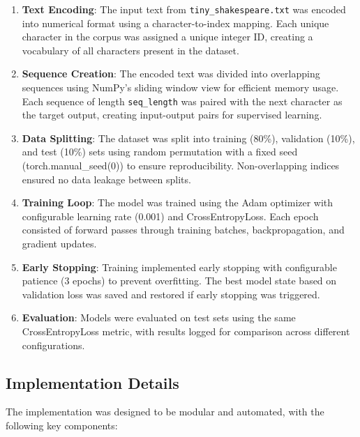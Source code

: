 \documentclass[12pt]{article}
\begin{document}
\begin{enumerate}
    \item \textbf{Text Encoding}: The input text from \texttt{tiny\_shakespeare.txt} was encoded into numerical format using a character-to-index mapping. Each unique character in the corpus was assigned a unique integer ID, creating a vocabulary of all characters present in the dataset.
    
    \item \textbf{Sequence Creation}: The encoded text was divided into overlapping sequences using NumPy's sliding window view for efficient memory usage. Each sequence of length \texttt{seq\_length} was paired with the next character as the target output, creating input-output pairs for supervised learning.
    
    \item \textbf{Data Splitting}: The dataset was split into training (80\%), validation (10\%), and test (10\%) sets using random permutation with a fixed seed (torch.manual\_seed(0)) to ensure reproducibility. Non-overlapping indices ensured no data leakage between splits.
    
    \item \textbf{Training Loop}: The model was trained using the Adam optimizer with configurable learning rate (0.001) and CrossEntropyLoss. Each epoch consisted of forward passes through training batches, backpropagation, and gradient updates.
    
    \item \textbf{Early Stopping}: Training implemented early stopping with configurable patience (3 epochs) to prevent overfitting. The best model state based on validation loss was saved and restored if early stopping was triggered.
    
    \item \textbf{Evaluation}: Models were evaluated on test sets using the same CrossEntropyLoss metric, with results logged for comparison across different configurations.
\end{enumerate}

\subsection{Implementation Details}
The implementation was designed to be modular and automated, with the following key components:
\end{document}
